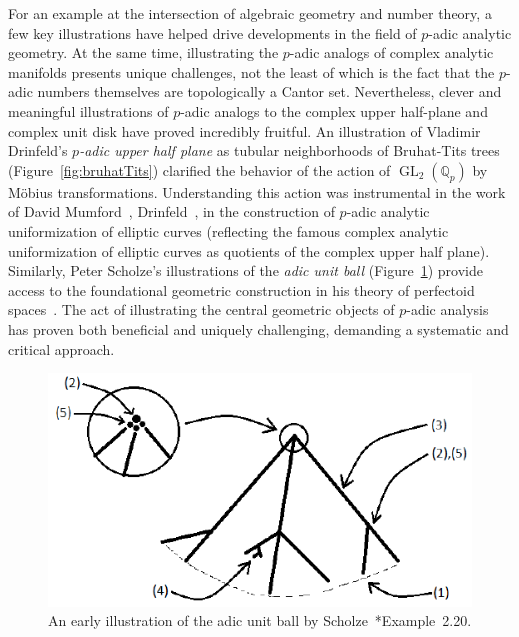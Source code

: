 \documentclass{notices}
\begin{document}
 For an example at the intersection of algebraic geometry and number theory, a few key illustrations have helped drive developments in the field of $p$-adic analytic geometry.  At the same time, illustrating the $p$-adic analogs of complex analytic manifolds presents unique challenges, not the least of which is the fact that the $p$-adic numbers themselves are topologically a Cantor set.   Nevertheless, clever and meaningful illustrations of $p$-adic analogs to the complex upper half-plane and complex unit disk have proved incredibly fruitful.
An illustration of Vladimir Drinfeld's \textit{$p$-adic upper half plane} as tubular neighborhoods of Bruhat-Tits trees (Figure~\ref{fig:bruhatTits}) clarified the behavior of the action of $\operatorname{GL}_2(\mathbb{Q}_p)$ by M\"obius transformations.  Understanding this action was instrumental in the work of David Mumford~\cite{mum72}, Drinfeld~\cite{drin76}, in the construction of $p$-adic analytic uniformization of elliptic curves (reflecting the famous complex analytic uniformization of elliptic 
curves as quotients of the complex upper half plane).  Similarly, Peter Scholze's illustrations of the \textit{adic unit ball} (Figure~\ref{fig:adicBall}) provide access to the foundational geometric construction in his theory of perfectoid spaces~\cite{sch12}.  The act of illustrating the central geometric objects of $p$-adic analysis has proven both beneficial and uniquely challenging, demanding a systematic and critical approach.
\begin{figure}
    \includegraphics[width=1.\linewidth]{images/adicBall.png}
    \caption{An early illustration of the adic unit ball by Scholze~\cite{sch12}*{Example~2.20}.}
    \label{fig:adicBall}
\end{figure}
\end{document}
